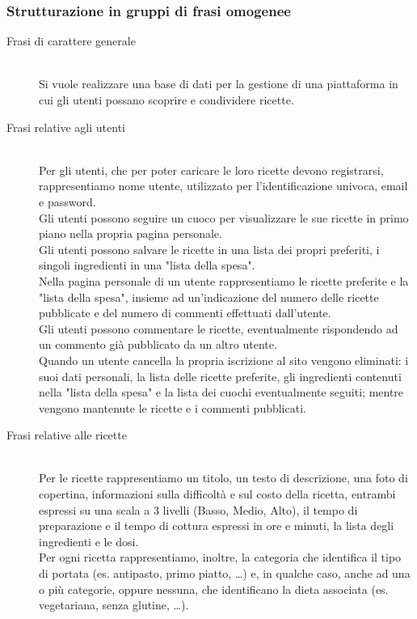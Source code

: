 \documentclass[12pt]{extarticle}
\begin{document}
\subsubsection{Strutturazione in gruppi di frasi omogenee}
\begin{description}
    \item[Frasi di carattere generale] \hfill 
    \\ Si vuole realizzare una base di dati per la gestione di una piattaforma in cui gli utenti possano scoprire e condividere ricette. 
    \item[Frasi relative agli utenti] \hfill
    \\ Per gli utenti, che per poter caricare le loro ricette devono registrarsi, rappresentiamo nome utente, utilizzato per l'identificazione univoca, email e password.
    \\ Gli utenti possono seguire un cuoco per visualizzare le sue ricette in primo piano nella propria pagina personale.
    \\ Gli utenti possono salvare le ricette in una lista dei propri preferiti, i singoli ingredienti in una "lista della spesa". 
    \\ Nella pagina personale di un utente rappresentiamo le ricette preferite e la "lista della spesa", insieme ad un'indicazione del numero delle ricette pubblicate e del numero di commenti effettuati dall'utente.
    \\ Gli utenti possono commentare le ricette, eventualmente rispondendo ad un commento già pubblicato da un altro utente.
    \\ Quando un utente cancella la propria iscrizione al sito vengono eliminati: i suoi dati personali, la lista delle ricette preferite, gli ingredienti contenuti nella "lista della spesa" e la lista dei cuochi eventualmente seguiti; mentre vengono mantenute le ricette e i commenti pubblicati.
    \item[Frasi relative alle ricette] \hfill
    \\ Per le ricette rappresentiamo un titolo, un testo di descrizione, una foto di copertina, informazioni sulla difficoltà e sul costo della ricetta, entrambi espressi su una scala a 3 livelli (Basso, Medio, Alto), il tempo di preparazione e il tempo di cottura espressi in ore e minuti, la lista degli ingredienti e le dosi.
    \\ Per ogni ricetta rappresentiamo, inoltre, la categoria che identifica il tipo di portata (es. antipasto, primo piatto, \dots) e, in qualche caso, anche ad una o più categorie, oppure nessuna, che identificano la dieta associata (es. vegetariana, senza glutine, \dots).

\end{description}
\end{document}
